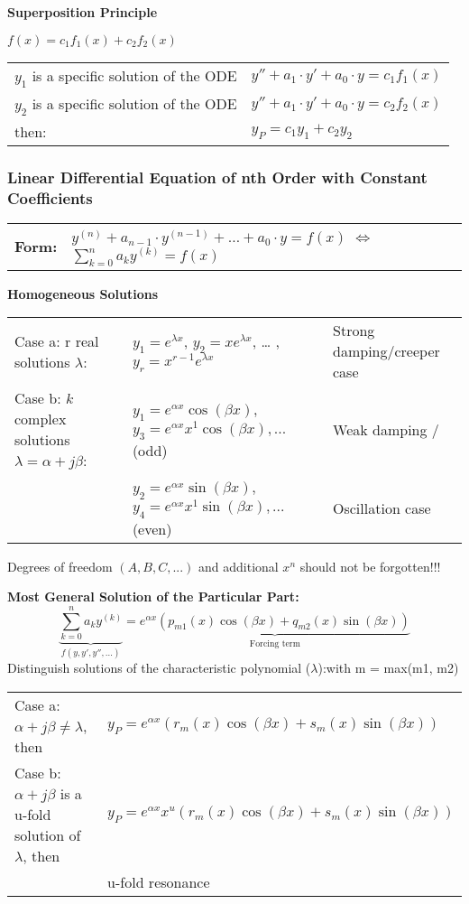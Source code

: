 	\textbf{Superposition Principle}

	$f(x)=c_1f_1(x)+c_2f_2(x)$\\
	\begin{tabular}{p{8cm}p{4cm}}
	$y_1$ is a specific solution of the ODE &
	$y''+a_1\cdot y'+a_0\cdot y=c_1f_1(x)$ \\
	$y_2$ is a specific solution of the ODE &
	$y''+a_1\cdot y'+a_0\cdot y=c_2f_2(x)$ \\
	then:                          &
	$y_P=c_1y_1+c_2y_2$\\
	\end{tabular}


	\newpage

	\subsubsection{Linear Differential Equation of nth Order with Constant Coefficients}
	\begin{tabular}{p{4cm}p{12cm}}
	\textbf{Form:} &
	$y^{(n)}+a_{n-1}\cdot y^{(n-1)}+\ldots +a_0\cdot y=f(x)$ $\Leftrightarrow$ $\sum\limits_{k=0}^na_ky^{(k)}=f(x)$\\
	\end{tabular}

	\textbf{Homogeneous Solutions}\\
	\begin{tabular}{lll}
	Case a: r real solutions $\lambda$:
		& $y_1=e^{\lambda x}$, $y_2=xe^{\lambda x}$, \ldots
		,$y_r=x^{r-1}e^{\lambda x}$
		& Strong damping/creeper case\\
	Case b: $k$ complex solutions $\lambda=\alpha +j\beta$:
		&$y_1=e^{\alpha x}\cos(\beta x)$, $y_{3}=e^{\alpha x}x^1\cos(\beta
	x),...$ (odd)
		& Weak damping /\\
		&$y_{2}=e^{\alpha x}\sin(\beta x)$, $y_{4}=e^{\alpha
	x}x^{1}\sin(\beta x),...$ (even)
		& Oscillation case\\
	\end{tabular}

	Degrees of freedom $(A,B,C, ...)$ and additional $x^{n}$ should not be forgotten!!!

	\textbf{Most General Solution of the Particular Part:}\\
	$$\underbrace{\sum_{k=0}^n a_k y^{(k)}}_{f(y,y',y'',\ldots)} = \underbrace{e^{\alpha x} (p_{m1}(x) \cos (\beta x) + q_{m2}(x) \sin (\beta x))}_{\text{Forcing term}}$$
	Distinguish solutions of the characteristic polynomial ($\lambda$):\hspace{5.5cm}with m = max(m1, m2)\\
	\begin{tabular}{p{8cm}p{8.5cm}}
	Case a: $\alpha + j\beta \neq \lambda$, then &
	$y_P = e^{\alpha x}(r_m(x)\cos(\beta x) + s_m(x) \sin(\beta x))$\\
	Case b: $\alpha + j\beta$  is a u-fold solution of $\lambda$, then &
	$y_P = e^{\alpha x} x^u (r_m(x) \cos(\beta x) + s_m(x) \sin(\beta x))$\\
	&
	u-fold resonance

	\end{tabular}

